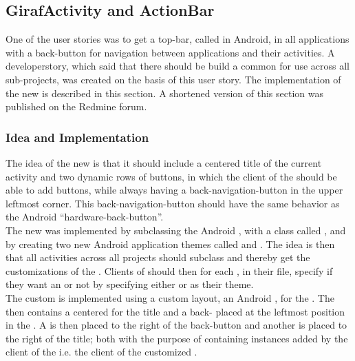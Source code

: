 \subsection{GirafActivity and ActionBar}
\label{sec:giraf_activity_actionbar}

One of the user stories was to get a top-bar, called  in Android, in all applications with a back-button for navigation between applications and their activities. A developerstory, which said that there should be build a common  for use across all sub-projects, was created on the basis of this user story. The implementation of the new \giraf {} is described in this section. A shortened version of this section was published on the \giraf Redmine \parencite{redmine} forum.

\subsubsection{Idea and Implementation}

The idea of the new  is that it should include a centered title of the current activity and two dynamic rows of \giraf buttons, in which the client of the  should be able to add buttons, while always having a back-navigation-button in the upper leftmost corner. This back-navigation-button should have the same behavior as the Android ``hardware-back-button''.\\

The new  was implemented by subclassing the Android , with a class called , and by creating two new Android application themes called  and . The idea is then that all activities across all projects should subclass  and thereby get the customizations of the . Clients of  should then for each , in their  file, specify if they want an  or not by specifying either  or  as their theme.\\

The custom  is implemented using a custom layout, an Android , for the . The  then contains a centered  for the title and a back- placed at the leftmost position in the . A  is then placed to the right of the back-button and another  is placed to the right of the title; both with the purpose of containing  instances added by the client of the  i.e. the client of the customized . \\


